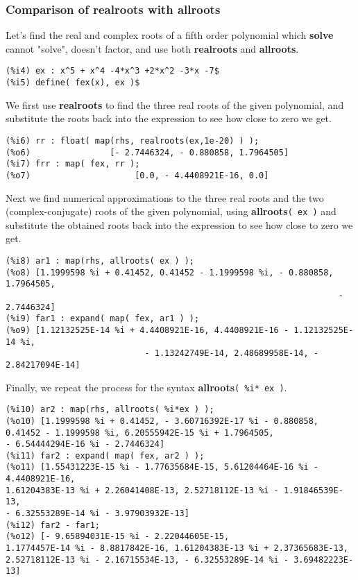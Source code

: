 \documentclass[12pt]{article}
\begin{document}
\subsubsection{Comparison of realroots with allroots}
Let's find the real and complex roots of a fifth order polynomial which
  \textbf{solve} cannot "solve", doesn't factor, and use both
  \textbf{realroots} and \textbf{allroots}.
\small
\begin{verbatim}
(%i4) ex : x^5 + x^4 -4*x^3 +2*x^2 -3*x -7$
(%i5) define( fex(x), ex )$ 
\end{verbatim}
\normalsize
We first use \textbf{realroots} to find the three real roots of the
  given polynomial, and substitute the roots back into the expression
  to see how close to zero we get.
\small
\begin{verbatim}
(%i6) rr : float( map(rhs, realroots(ex,1e-20) ) );
(%o6)                [- 2.7446324, - 0.880858, 1.7964505]
(%i7) frr : map( fex, rr );
(%o7)                     [0.0, - 4.4408921E-16, 0.0]
\end{verbatim}
\normalsize
\newpage
Next we find numerical approximations to the three real roots and the
  two (complex-conjugate) roots of the given polynomial, using
   \textbf{allroots}\verb|( ex )|  and substitute the obtained roots back into
   the expression to see how close to zero we get.
\small
\begin{verbatim}
(%i8) ar1 : map(rhs, allroots( ex ) );
(%o8) [1.1999598 %i + 0.41452, 0.41452 - 1.1999598 %i, - 0.880858, 1.7964505, 
                                                                   - 2.7446324]
(%i9) far1 : expand( map( fex, ar1 ) );
(%o9) [1.12132525E-14 %i + 4.4408921E-16, 4.4408921E-16 - 1.12132525E-14 %i, 
                            - 1.13242749E-14, 2.48689958E-14, - 2.84217094E-14]
\end{verbatim}
\normalsize
Finally, we repeat the process for the syntax \textbf{allroots}\verb|( %i* ex )|.
\small
\begin{verbatim}
(%i10) ar2 : map(rhs, allroots( %i*ex ) );
(%o10) [1.1999598 %i + 0.41452, - 3.60716392E-17 %i - 0.880858, 
0.41452 - 1.1999598 %i, 6.20555942E-15 %i + 1.7964505, 
- 6.54444294E-16 %i - 2.7446324]
(%i11) far2 : expand( map( fex, ar2 ) );
(%o11) [1.55431223E-15 %i - 1.77635684E-15, 5.61204464E-16 %i - 4.4408921E-16, 
1.61204383E-13 %i + 2.26041408E-13, 2.52718112E-13 %i - 1.91846539E-13, 
- 6.32553289E-14 %i - 3.97903932E-13]
(%i12) far2 - far1;
(%o12) [- 9.65894031E-15 %i - 2.22044605E-15, 
1.1774457E-14 %i - 8.8817842E-16, 1.61204383E-13 %i + 2.37365683E-13, 
2.52718112E-13 %i - 2.16715534E-13, - 6.32553289E-14 %i - 3.69482223E-13]
\end{verbatim}
\end{document}
